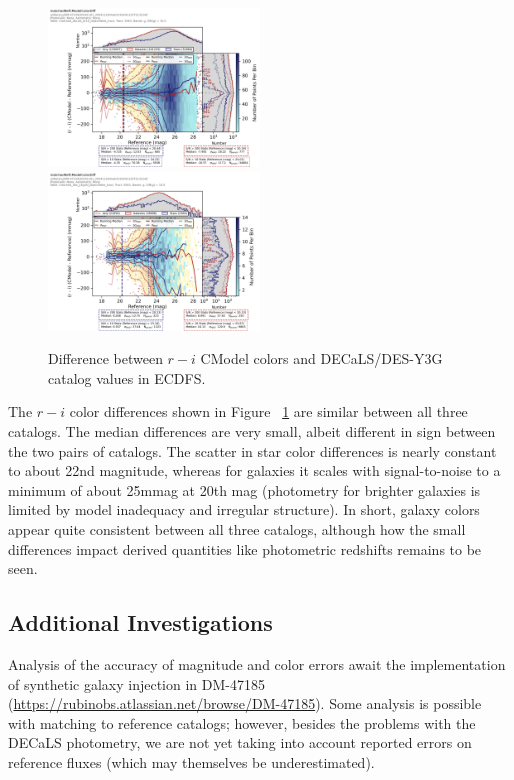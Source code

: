 \begin{figure}
  \includegraphics[width=0.5\textwidth]{galaxy_photometry/cdfs_g_vs_rmi_DECaLS.png}
  \includegraphics[width=0.5\textwidth]{galaxy_photometry/cdfs_g_vs_rmi_desy3g.png}
\caption{Difference between $r-i$ CModel colors and DECaLS/DES-Y3G catalog values in ECDFS.}
  \label{fig:cdfs_rmi_vs_des}
\end{figure}

The $r-i$ color differences shown in Figure ~\ref{fig:cdfs_rmi_vs_des} are similar between all three catalogs.
The median differences are very small, albeit different in sign between the two pairs of catalogs.
The scatter in star color differences is nearly constant to about 22nd magnitude, whereas for galaxies it scales with signal-to-noise to a minimum of about 25mmag at 20th mag (photometry for brighter galaxies is limited by model inadequacy and irregular structure).
In short, galaxy colors appear quite consistent between all three catalogs, although how the small differences impact derived quantities like photometric redshifts remains to be seen.

\subsection{Additional Investigations}
\label{subsec:galaxy_photometry_additional}

Analysis of the accuracy of magnitude and color errors await the implementation of synthetic galaxy injection in DM-47185 (\url{https://rubinobs.atlassian.net/browse/DM-47185}).
Some analysis is possible with matching to reference catalogs; however, besides the problems with the DECaLS photometry, we are not yet taking into account reported errors on reference fluxes (which may themselves be underestimated).

